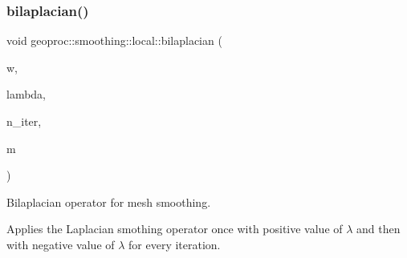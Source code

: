 \subsubsection{\texorpdfstring{bilaplacian()}{bilaplacian()}\hspace{0.1cm}{\footnotesize\ttfamily [1/2]}}
{\footnotesize\ttfamily void geoproc\+::smoothing\+::local\+::bilaplacian (\begin{DoxyParamCaption}\item[{const \hyperlink{namespacegeoproc_a12e5a10581b53b9dd9a509127527f843}{weight} \&}]{w,  }\item[{double}]{lambda,  }\item[{size\+\_\+t}]{n\+\_\+iter,  }\item[{\hyperlink{classgeoproc_1_1TriangleMesh}{Triangle\+Mesh} \&}]{m }\end{DoxyParamCaption})}



Bilaplacian operator for mesh smoothing. 

Applies the Laplacian smothing operator once with positive value of $\lambda$ and then with negative value of $\lambda$ for every iteration.

